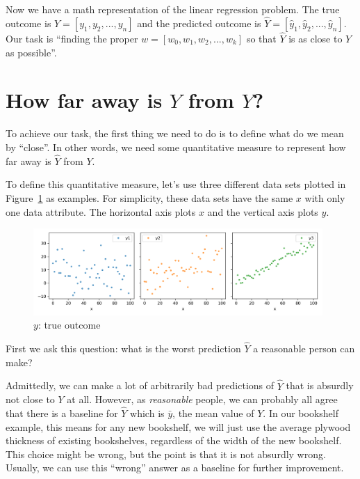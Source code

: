 \documentclass[
	letterpaper
]{article}
\begin{document}
Now we have a math representation of the linear regression problem.
The true outcome is $Y = [y_1, y_2, ..., y_n]$ and the predicted outcome is $\hat Y = [ \hat y_1, \hat y_2, ..., \hat y_n]$.
Our task is ``finding the proper $w = [w_0, w_1, w_2, ..., w_k]$ so that $\hat Y$ is as close to $Y$ as possible''.

\section{How far away is $\hat Y$ from $Y$?}
To achieve our task, the first thing we need to do is to define what do we mean by ``close''.
In other words, we need some quantitative measure to represent how far away is $\hat Y$ from $Y$.

To define this quantitative measure, let's use three different data sets plotted in Figure~\ref{fig:raw-data} as examples.
For simplicity, these data sets have the same $x$ with only one data attribute.
The horizontal axis plots $x$ and the vertical axis plots $y$.
\begin{figure}[htbp]
	\centering
	\includegraphics[width=0.98\textwidth]{figures/comparison-raw-data.png}
	\caption{$y$: true outcome}
	\label{fig:raw-data}
\end{figure}

First we ask this question: what is the worst prediction $\hat Y$ a reasonable person can make?

Admittedly, we can make a lot of arbitrarily bad predictions of $\hat Y$ that is absurdly not close to $Y$ at all.
However, as \textit{reasonable} people,  we can probably all agree that there is a baseline for $\hat Y$ which is $\bar y$, the mean value of $Y$.
In our bookshelf example, this means for any new bookshelf, we will just use the average plywood thickness of existing bookshelves, regardless of the width of the new bookshelf.
This choice might be wrong, but the point is that it is not absurdly wrong.
Usually, we can use this ``wrong'' answer as a baseline for further improvement.
\end{document}
